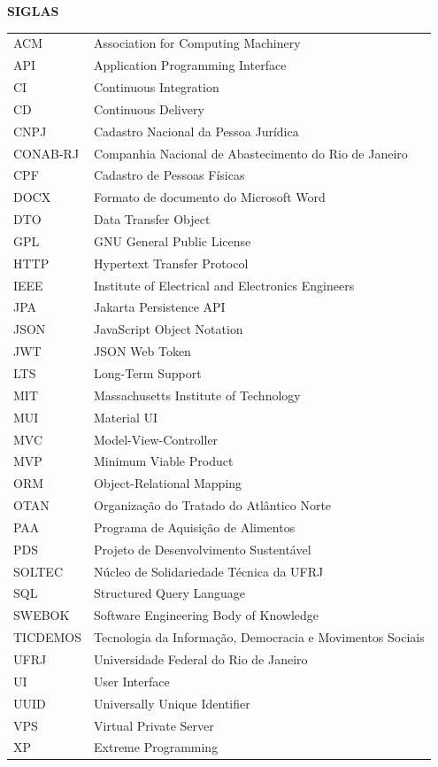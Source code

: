 \clearpage
\thispagestyle{plain}
\begin{center}
    \textbf{SIGLAS}
\end{center}
\vspace*{8.6mm}

\begingroup
\renewcommand{\baselinestretch}{1}\small\selectfont
\setlength{\tabcolsep}{0pt}
\renewcommand{\arraystretch}{1.05}
\begin{longtable}{@{}p{}p{}@{}}
ACM      & Association for Computing Machinery \\
API      & Application Programming Interface \\
CI       & Continuous Integration \\
CD       & Continuous Delivery \\
CNPJ     & Cadastro Nacional da Pessoa Jurídica \\
CONAB-RJ & Companhia Nacional de Abastecimento do Rio de Janeiro \\
CPF      & Cadastro de Pessoas Físicas \\
DOCX     & Formato de documento do Microsoft Word \\
DTO      & Data Transfer Object  \\
GPL      & GNU General Public License \\
HTTP     & Hypertext Transfer Protocol  \\
IEEE     & Institute of Electrical and Electronics Engineers \\
JPA      & Jakarta Persistence API \\
JSON     & JavaScript Object Notation \\
JWT      & JSON Web Token \\
LTS      & Long-Term Support \\
MIT      & Massachusetts Institute of Technology \\
MUI      & Material UI \\
MVC      & Model-View-Controller  \\
MVP      & Minimum Viable Product  \\
ORM      & Object-Relational Mapping  \\
OTAN     & Organização do Tratado do Atlântico Norte \\
PAA      & Programa de Aquisição de Alimentos \\
PDS      & Projeto de Desenvolvimento Sustentável \\
SOLTEC   & Núcleo de Solidariedade Técnica da UFRJ \\
SQL      & Structured Query Language  \\
SWEBOK   & Software Engineering Body of Knowledge \\
TICDEMOS & Tecnologia da Informação, Democracia e Movimentos Sociais \\
UFRJ     & Universidade Federal do Rio de Janeiro \\
UI       & User Interface  \\
UUID     & Universally Unique Identifier  \\
VPS      & Virtual Private Server  \\
XP       & Extreme Programming \\
\end{longtable}
\endgroup
